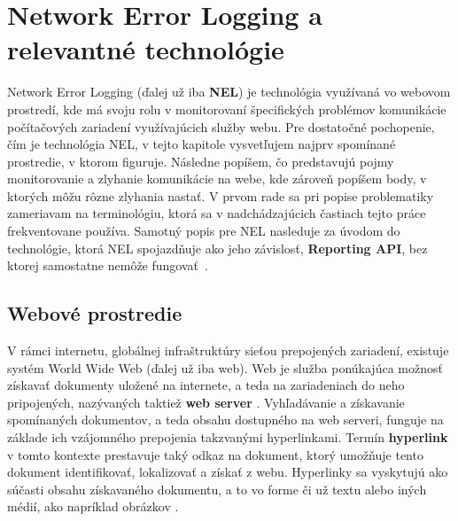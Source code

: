 \chapter{Network Error Logging a relevantné technológie}
\label{nel-and-related-technologies}

Network Error Logging (ďalej už iba \textbf{NEL}) je technológia využívaná vo webovom prostredí, 
kde má svoju rolu v monitorovaní špecifických problémov komunikácie počítačových zariadení využívajúcich služby webu.
Pre dostatočné pochopenie, čím je technológia NEL, v tejto kapitole vysvetľujem najprv 
spomínané prostredie, v ktorom figuruje. 
Následne popíšem, čo predstavujú pojmy monitorovanie a zlyhanie komunikácie na webe, kde zároveň popíšem body, v ktorých môžu rôzne zlyhania nastať. 
V prvom rade sa pri popise problematiky zameriavam na terminológiu, ktorá sa v nadchádzajúcich častiach tejto práce frekventovane používa. 
Samotný popis pre NEL nasleduje za úvodom do technológie, ktorá NEL spojazdňuje ako jeho závislosť, \textbf{Reporting API}, bez ktorej samostatne nemôže \mbox{fungovať \cite{W3C-NEL}}.


\section{Webové prostredie}
\label{webove-prostredie}

V rámci internetu, globálnej infraštruktúry sieťou prepojených zariadení, existuje systém World Wide Web (ďalej už iba web).
Web je služba ponúkajúca možnosť získavať dokumenty uložené na internete, a teda na zariadeniach do neho pripojených, nazývaných taktiež \textbf{web server} \cite{wiki-web}. 
Vyhľadávanie a získavanie spomínaných dokumentov, a teda obsahu dostupného na web serveri, funguje na základe ich vzájomného prepojenia takzvanými hyperlinkami.
Termín \textbf{hyperlink} v tomto kontexte prestavuje taký odkaz na dokument, ktorý umožňuje tento dokument identifikovať, lokalizovať a získať z webu. 
Hyperlinky sa vyskytujú ako súčasti obsahu získavaného dokumentu, a to vo forme či už textu alebo iných médií, ako napríklad obrázkov \cite{wiki-hyperlink}. 



